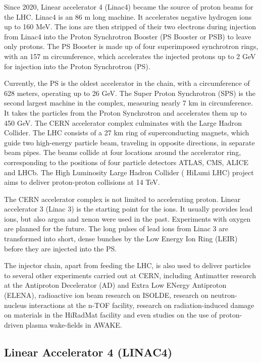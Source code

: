 Since 2020, Linear accelerator 4 (Linac4) became the source of proton beams for the LHC. Linac4 is an 86 \si{\meter} long machine. It accelerates negative hydrogen ions up to 160 \si{\mega \electronvolt}. The ions are then stripped of their two electrons during injection from Linac4 into the Proton Synchrotron Booster (PS Booster or PSB) to leave only protons. The PS Booster is made up of four superimposed synchrotron rings, with an 157 \si{\meter} circumference, which accelerates the injected protons up to 2 GeV for injection into the Proton Synchrotron (PS). 

Currently, the PS is the oldest accelerator in the chain, with a circumference of 628 meters, operating up to 26 \si{\giga \electronvolt}. The Super Proton Synchrotron (SPS) is the second largest machine in the complex, measuring nearly 7 \si{\kilo \meter} in circumference. It takes the particles from the Proton Synchrotron and accelerates them up to 450 \si{\giga \electronvolt}. The CERN accelerator complex culminates with the Large Hadron Collider. The LHC consists of a 27 \si{\kilo \meter} ring of superconducting magnets, which guide two high-energy particle beam, traveling in opposite directions, in separate beam pipes. The beams collide at four locations around the accelerator ring, corresponding to the positions of four particle detectors ATLAS, CMS, ALICE and LHCb. The High Luminosity Large Hadron Collider ( HiLumi LHC) project aims to deliver proton-proton collisions at 14 \si{\tera \electronvolt}.

The CERN accelerator complex is not limited to accelerating proton. Linear accelerator 3 (Linac 3) is the starting point for the ions. It usually provides lead ions, but also argon and xenon were used in the past. Experiments with oxygen are planned for the future. The long pulses of lead ions from Linac 3 are transformed into short, dense bunches by the Low Energy Ion Ring (LEIR) before they are injected into the PS. 

The injector chain, apart from feeding the LHC, is also used to deliver particles to several other experiments carried out at CERN, including Antimatter research at the Antiproton Decelerator (AD) and Extra Low ENergy Antiproton (ELENA), radioactive ion beam research on ISOLDE, research on neutron-nucleus interactions at the n-TOF facility, research on radiation-induced damage on materials in the HiRadMat facility and even studies on the use of proton-driven plasma wake-fields in AWAKE. 

\subsection{Linear Accelerator 4 (LINAC4)}
\label{sec:LINAC4}

